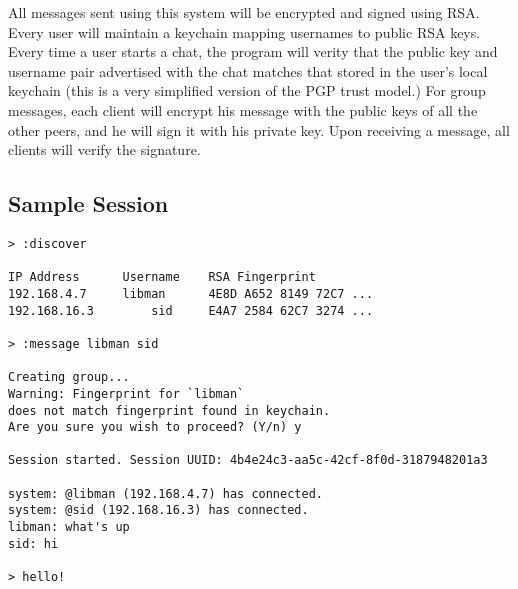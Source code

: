 \documentclass[a4paper]{article}
\begin{document}
All messages sent using this system will be encrypted and signed using RSA. Every user will maintain a keychain mapping usernames to public RSA keys. Every time a user starts a chat, the program will verity that the public key and username pair advertised with the chat matches that stored in the user's local keychain (this is a very simplified version of the PGP trust model.) For group messages, each client will encrypt his message with the public keys of all the other peers, and he will sign it with his private key. Upon receiving a message, all clients will verify the signature.

\subsection{Sample Session}
\begin{lstlisting}
> :discover

IP Address		Username	RSA Fingerprint
192.168.4.7		libman		4E8D A652 8149 72C7 ...
192.168.16.3		sid		E4A7 2584 62C7 3274 ...

> :message libman sid

Creating group...
Warning: Fingerprint for `libman` 
does not match fingerprint found in keychain.
Are you sure you wish to proceed? (Y/n) y

Session started. Session UUID: 4b4e24c3-aa5c-42cf-8f0d-3187948201a3

system: @libman (192.168.4.7) has connected.
system: @sid (192.168.16.3) has connected.
libman: what's up
sid: hi

> hello!
		

\end{lstlisting}
\end{document}

